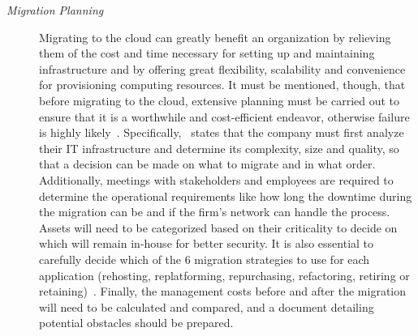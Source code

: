 \begin{description}
    \item[\textit{Migration Planning}] Migrating to the cloud can greatly benefit an organization by relieving them of the cost and time necessary for setting up and maintaining infrastructure and by offering great flexibility, scalability and convenience for provisioning computing resources. It must be mentioned, though, that before migrating to the cloud, extensive planning must be carried out to ensure that it is a worthwhile and cost-efficient endeavor, otherwise failure is highly likely~\cite{cloud-failure}. Specifically,~\cite{migration-planning} states that the company must first analyze their IT infrastructure and determine its complexity, size and quality, so that a decision can be made on what to migrate and in what order. Additionally, meetings with stakeholders and employees are required to determine the operational requirements like how long the downtime during the migration can be and if the firm's network can handle the process. Assets will need to be categorized based on their criticality to decide on which will remain in-house for better security. It is also essential to carefully decide which of the 6 migration strategies to use for each application (rehosting, replatforming, repurchasing, refactoring, retiring or retaining)~\cite{6rs}. Finally, the management costs before and after the migration will need to be calculated and compared, and a document detailing potential obstacles should be prepared.
\end{description}
